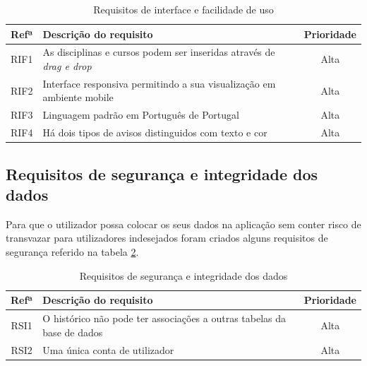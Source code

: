 \documentclass[11pt, twoside]{report}
\begin{document}
	\begin{table}[H]
	\caption{Requisitos de interface e facilidade de uso}
	
	\begin{center}
		\begin{tabularx}{\textwidth}{|c|X|c|}
			\hline
			\textbf{Refª }	& \textbf{Descrição do requisito} & \textbf{Prioridade} \\
			\hline
			RIF1 & As disciplinas e cursos podem ser inseridas através de \textit{drag e drop} &Alta\\
			\hline
			RIF2 & Interface responsiva permitindo a sua visualização em ambiente mobile &Alta\\
			\hline
			RIF3 & Linguagem padrão em Português de Portugal &Alta\\
			\hline
			RIF4 & Há dois tipos de avisos distinguidos com texto e cor &Alta\\
			\hline
		\end{tabularx}
		\label{requisitosdeinterface}
	\end{center}
	\end{table}

	\subsection{Requisitos de segurança e integridade dos dados}
	
	Para que o utilizador possa colocar os seus dados na aplicação sem conter risco de transvazar para utilizadores indesejados foram criados alguns requisitos de segurança referido na	tabela \ref{requisitosdeseguranca}.
	
\begin{table}[H]	
	\caption{Requisitos de segurança e integridade dos dados}
	
	
	\begin{center}
		\begin{tabularx}{\textwidth}{|c|X|c|}
			\hline
			\textbf{Refª }	& \textbf{Descrição do requisito} & \textbf{Prioridade} \\
			\hline
			RSI1 &O histórico não pode ter associações a outras tabelas da base de dados  &Alta\\
			\hline
			RSI2 & Uma única conta de utilizador&Alta\\
			\hline
		\end{tabularx}
		\label{requisitosdeseguranca}
	\end{center}
\end{table}
\end{document}
